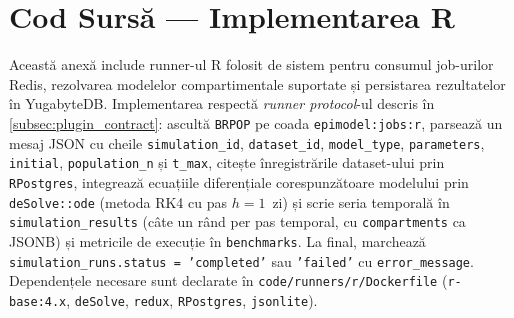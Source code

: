 \chapter{Cod Sursă — Implementarea R}
\label{app:cod_r}

Această anexă include runner-ul R folosit de sistem pentru consumul job-urilor
Redis, rezolvarea modelelor compartimentale suportate și persistarea
rezultatelor în YugabyteDB. Implementarea respectă \emph{runner protocol}-ul
descris în \cref{subsec:plugin_contract}: ascultă \texttt{BRPOP} pe coada
\texttt{epimodel:jobs:r}, parsează un mesaj JSON cu cheile
\texttt{simulation\_id}, \texttt{dataset\_id}, \texttt{model\_type},
\texttt{parameters}, \texttt{initial}, \texttt{population\_n} și
\texttt{t\_max}, citește înregistrările dataset-ului prin
\texttt{RPostgres}, integrează ecuațiile diferențiale corespunzătoare
modelului prin \texttt{deSolve::ode} (metoda RK4 cu pas $h=1$~zi) și scrie
seria temporală în \texttt{simulation\_results} (câte un rând per pas
temporal, cu \texttt{compartments} ca JSONB) și metricile de execuție în
\texttt{benchmarks}. La final, marchează \texttt{simulation\_runs.status =
'completed'} sau \texttt{'failed'} cu \texttt{error\_message}. Dependențele
necesare sunt declarate în \texttt{code/runners/r/Dockerfile}
(\texttt{r-base:4.x}, \texttt{deSolve}, \texttt{redux}, \texttt{RPostgres},
\texttt{jsonlite}).


